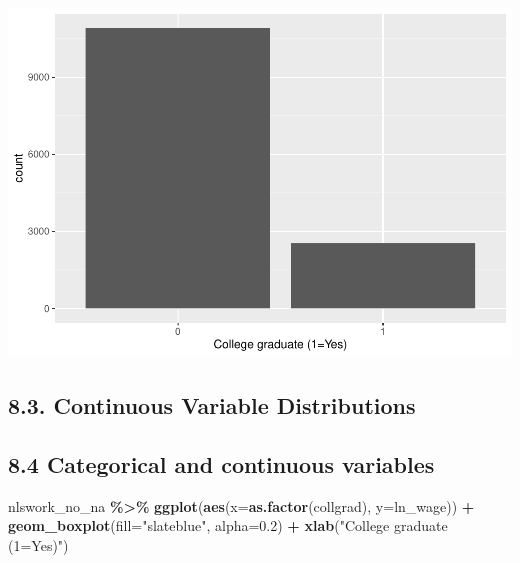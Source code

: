 \documentclass[
]{article}
\newenvironment{Shaded}{\begin{snugshade}}{\end{snugshade}}
\newcommand{\AttributeTok}[1]{\textcolor[rgb]{0.13,0.29,0.53}{#1}}
\newcommand{\FloatTok}[1]{\textcolor[rgb]{0.00,0.00,0.81}{#1}}
\newcommand{\FunctionTok}[1]{\textcolor[rgb]{0.13,0.29,0.53}{\textbf{#1}}}
\newcommand{\NormalTok}[1]{#1}
\newcommand{\SpecialCharTok}[1]{\textcolor[rgb]{0.81,0.36,0.00}{\textbf{#1}}}
\newcommand{\StringTok}[1]{\textcolor[rgb]{0.31,0.60,0.02}{#1}}
\begin{document}
\includegraphics{RIntro_files/figure-latex/unnamed-chunk-19-1.pdf}

\hypertarget{continuous-variable-distributions}{%
\subsection{8.3. Continuous Variable
Distributions}\label{continuous-variable-distributions}}

\hypertarget{categorical-and-continuous-variables}{%
\subsection{8.4 Categorical and continuous
variables}\label{categorical-and-continuous-variables}}

\begin{Shaded}
\begin{Highlighting}[]
\NormalTok{nlswork\_no\_na }\SpecialCharTok{\%\textgreater{}\%} \FunctionTok{ggplot}\NormalTok{(}\FunctionTok{aes}\NormalTok{(}\AttributeTok{x=}\FunctionTok{as.factor}\NormalTok{(collgrad), }\AttributeTok{y=}\NormalTok{ln\_wage)) }\SpecialCharTok{+}
  \FunctionTok{geom\_boxplot}\NormalTok{(}\AttributeTok{fill=}\StringTok{"slateblue"}\NormalTok{, }\AttributeTok{alpha=}\FloatTok{0.2}\NormalTok{) }\SpecialCharTok{+} 
  \FunctionTok{xlab}\NormalTok{(}\StringTok{"College graduate (1=Yes)"}\NormalTok{)}
\end{Highlighting}
\end{Shaded}
\end{document}
